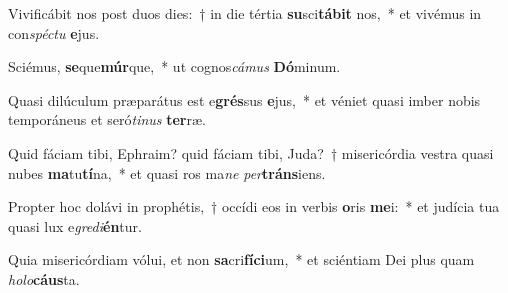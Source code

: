 \item Vivificábit nos post duos dies:~† in die tértia \textbf{su}sci\textbf{tá}\textbf{bit} nos,~* et vivémus in con\textit{spéc}\textit{tu} \textbf{e}jus.
\item Sciémus, \textbf{se}que\textbf{múr}que,~* ut cognos\textit{cá}\textit{mus} \textbf{Dó}minum.
\item Quasi dilúculum præparátus est e\textbf{grés}sus \textbf{e}jus,~* et véniet quasi imber nobis temporáneus et seró\textit{ti}\textit{nus} \textbf{ter}ræ.
\item Quid fáciam tibi, Ephraim? quid fáciam tibi, Juda?~† misericórdia vestra quasi nubes \textbf{ma}tu\textbf{tí}na,~* et quasi ros ma\textit{ne} \textit{per}\textbf{tráns}iens.
\item Propter hoc dolávi in prophétis,~† occídi eos in verbis \textbf{o}ris \textbf{me}i:~* et judícia tua quasi lux e\textit{gre}\textit{di}\textbf{én}tur.
\item Quia misericórdiam vólui, et non \textbf{sa}cri\textbf{fí}\textbf{ci}um,~* et sciéntiam Dei plus quam \textit{ho}\textit{lo}\textbf{cáus}ta.
